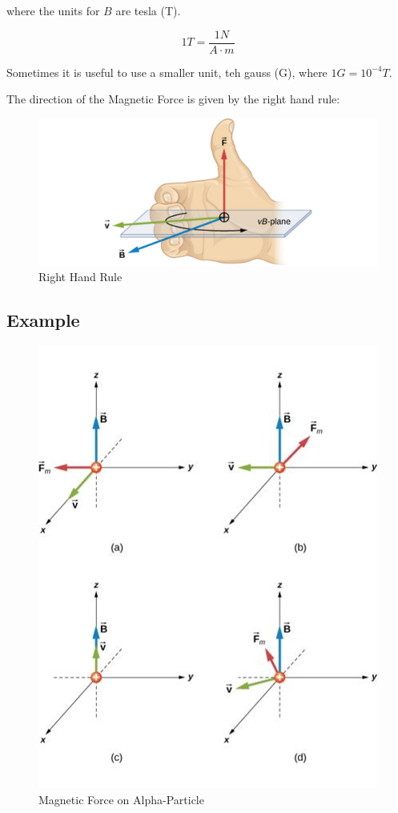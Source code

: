 \documentclass[14pt]{memoir}
\begin{document}
where the units for $B$ are tesla (T). 

\begin{equation}
1 T = \frac{1 N}{A \cdot m}
\end{equation}

Sometimes it is useful to use a smaller unit, teh gauss (G), where $1 G = 10^{-4} T$.

The direction of the Magnetic Force is given by the right hand rule:

\begin{figure}[H]
\begin{center}
\includegraphics[scale=0.60]{fig/fig_11_04.jpg}
\caption{Right Hand Rule}
\label{fig:11_04}
\end{center}
\end{figure}


\subsection{Example}

\begin{figure}[H]
\begin{center}
\includegraphics[scale=0.60]{fig/fig_11_05.jpg}
\caption{Magnetic Force on Alpha-Particle}
\label{fig:11_05}
\end{center}
\end{figure}
\end{document}
